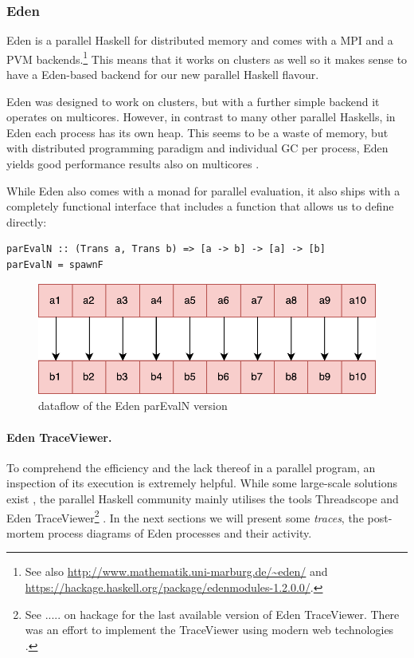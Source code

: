\subsubsection{Eden}
Eden \cite{eden,Loogen2012} is a parallel Haskell for distributed memory and comes with a MPI and a PVM backends.\footnote{See also \url{http://www.mathematik.uni-marburg.de/~eden/} and \url{https://hackage.haskell.org/package/edenmodules-1.2.0.0/}.} This means that it works on clusters as well so it makes sense to have a Eden-based backend for our new parallel Haskell flavour.

Eden was designed to work on clusters, but with a further simple backend it operates on multicores. However, in contrast to many other parallel Haskells, in Eden each process has its own heap. This seems to be a waste of memory, but with distributed programming paradigm and individual GC per process, Eden yields good performance results also on multicores \cite{arcs-dc,aswad2009low}.

While Eden also comes with a monad  for parallel evaluation, it also ships with a completely functional interface that includes
a  function that
allows us to define  directly:

\begin{lstlisting}[frame=htrbl]
parEvalN :: (Trans a, Trans b) => [a -> b] -> [a] -> [b]
parEvalN = spawnF 
\end{lstlisting}
\begin{figure}[h]
	\includegraphics[scale=0.5]{images/parEvalNEden}
	\caption{dataflow of the Eden parEvalN version}
\end{figure}

\paragraph{Eden TraceViewer.}
To comprehend the efficiency and the lack thereof in a parallel program, an inspection of its execution is extremely helpful. While some large-scale solutions exist \cite{Geimer2010}, the parallel Haskell community mainly utilises the tools Threadscope \cite{Wheeler2009} and Eden TraceViewer\footnote{See ..... on hackage for the last available version of Eden TraceViewer. There was an effort to implement the TraceViewer using modern web technologies \cite{traceviewer-web}.} \cite{Berthold2007a}. In the next sections we will present some \emph{traces}, the post-mortem process diagrams of Eden processes and their activity.

